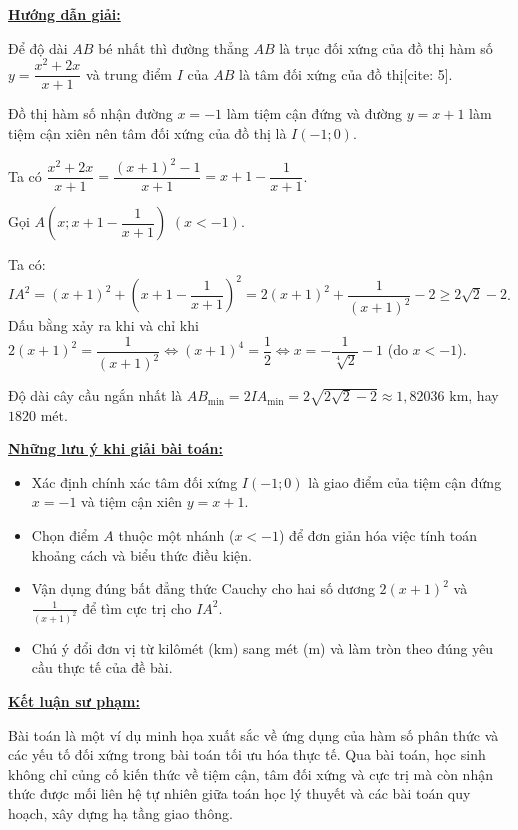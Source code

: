 \documentclass[12pt,a4paper,oneside]{book}
\theoremstyle{theorem}
\theoremstyle{definition}
\begin{document}
         \textbf{\underline{Hướng dẫn giải:}}

            Để độ dài $AB$ bé nhất thì đường thẳng $AB$ là trục đối xứng của đồ thị hàm số $y = \dfrac{x^2 + 2x}{x + 1}$ và trung điểm $I$ của $AB$ là tâm đối xứng của đồ thị[cite: 5].

            Đồ thị hàm số nhận đường $x = -1$ làm tiệm cận đứng và đường $y = x + 1$ làm tiệm cận xiên nên tâm đối xứng của đồ thị là $I(-1; 0)$.
            
            Ta có  $\dfrac{x^2 + 2x}{x + 1} = \dfrac{(x+1)^2 - 1}{x + 1} = x + 1 - \dfrac{1}{x + 1}$. 
            
            Gọi $A\left(x; x + 1 - \dfrac{1}{x + 1}\right)$ $(x < -1)$.
            
            Ta có: $IA^2 = (x + 1)^2 + \left(x + 1 - \dfrac{1}{x + 1}\right)^2 = 2(x + 1)^2 + \dfrac{1}{(x + 1)^2} - 2 \ge 2\sqrt{2} - 2$. Dấu bằng xảy ra khi và chỉ khi $2(x + 1)^2 = \dfrac{1}{(x + 1)^2} \Leftrightarrow (x + 1)^4 = \dfrac{1}{2} \Leftrightarrow x = -\dfrac{1}{\sqrt[4]{2}} - 1$ (do $x < -1$).
            
            Độ dài cây cầu ngắn nhất là $AB_{\min} = 2IA_{\min} = 2\sqrt{2\sqrt{2} - 2} \approx 1{,}82036\text{ km}$, hay $1820\text{ mét}$.
         
                \textbf{\underline{Những lưu ý khi giải bài toán:}}
        \begin{itemize}
            \item Xác định chính xác tâm đối xứng $I(-1; 0)$ là giao điểm của tiệm cận đứng $x = -1$ và tiệm cận xiên $y = x + 1$.
            \item Chọn điểm $A$ thuộc một nhánh ($x < -1$) để đơn giản hóa việc tính toán khoảng cách và biểu thức điều kiện.
            \item Vận dụng đúng bất đẳng thức Cauchy cho hai số dương $2(x + 1)^2$ và $\frac{1}{(x + 1)^2}$ để tìm cực trị cho $IA^2$.
            \item Chú ý đổi đơn vị từ kilômét ($\text{km}$) sang mét ($\text{m}$) và làm tròn theo đúng yêu cầu thực tế của đề bài.
        \end{itemize}
        
        \textbf{\underline{Kết luận sư phạm:}}
        
        Bài toán là một ví dụ minh họa xuất sắc về ứng dụng của hàm số phân thức và các yếu tố đối xứng trong bài toán tối ưu hóa thực tế. Qua bài toán, học sinh không chỉ củng cố kiến thức về tiệm cận, tâm đối xứng và cực trị mà còn nhận thức được mối liên hệ tự nhiên giữa toán học lý thuyết và các bài toán quy hoạch, xây dựng hạ tầng giao thông.
        
\end{document}
